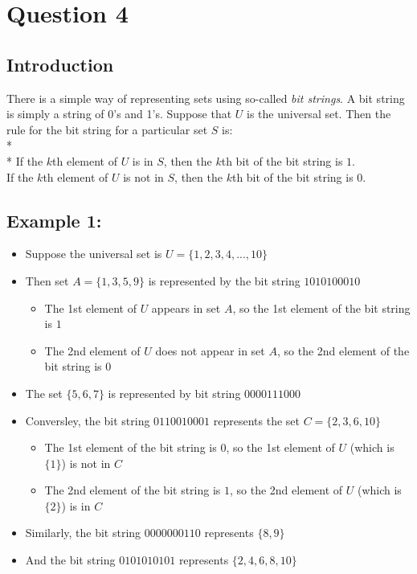 \documentclass[12pt,a4paper]{article}
\begin{document}
\section{Question 4}

\subsection{Introduction}

There is a simple way of representing sets using so-called \emph{bit strings}. A bit string is simply a string of 0's and 1's. Suppose that $U$ is the universal set. Then the rule for the bit string for a particular set $S$ is:
\\*
\\*
If the $k$th element of $U$ is in $S$, then the $k$th bit of the bit string is $1$. \\
If the $k$th element of $U$ is not in $S$, then the $k$th bit of the bit string is $0$.

\subsection{Example 1:}
\begin{itemize}
\item Suppose the universal set is $U = \{1, 2, 3, 4, ..., 10\}$
\item Then set $A = \{1, 3, 5, 9\}$ is represented by the bit string $1010100010$
	\begin{itemize}
	\item The 1st element of $U$ appears in set $A$, so the 1st element of the bit string is $1$
	\item The 2nd element of $U$ does not appear in set $A$, so the 2nd element of the bit string is $0$
	\end{itemize}
\item The set $\{5, 6, 7\}$ is represented by bit string $0000111000$
\item Conversley, the bit string $0110010001$ represents the set $C = \{2, 3, 6, 10\}$
	\begin{itemize}		
	\item The 1st element of the bit string is $0$, so the 1st element of $U$ (which is $\{1\}$) is not in $C$
	\item The 2nd element of the bit string is $1$, so the 2nd element of $U$ (which is $\{2\}$) is in $C$
	\end{itemize}	
\item Similarly, the bit string $0000000110$ represents $\{8, 9\}$
\item And the bit string $0101010101$ represents $\{2, 4, 6, 8, 10\}$
\end{itemize}
\end{document}
